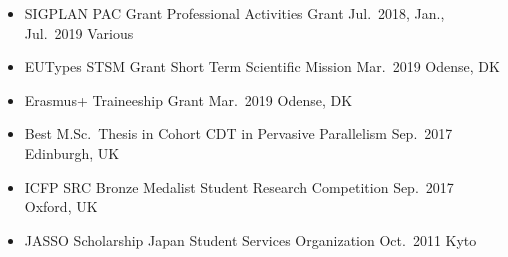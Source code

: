 \begin{itemize}
\item
  \cvevent
  {SIGPLAN PAC Grant}
  {Professional Activities Grant}
  {Jul.\ 2018, Jan., Jul.\ 2019}
  {Various}
\item
  \cvevent
  {EUTypes STSM Grant}
  {Short Term Scientific Mission}
  {Mar.\ 2019}
  {Odense, DK}
\item
  \cvevent
  {Erasmus+ Traineeship Grant}
  {}
  {Mar.\ 2019}
  {Odense, DK}
\item
  \cvevent
  {Best M.Sc.\ Thesis in Cohort}
  {CDT in Pervasive Parallelism}
  {Sep.\ 2017}
  {Edinburgh, UK}
\item
  \cvevent
  {ICFP SRC Bronze Medalist}
  {Student Research Competition}
  {Sep.\ 2017}
  {Oxford, UK}
\item
  \cvevent
  {JASSO Scholarship}
  {Japan Student Services Organization}
  {Oct.\ 2011}
  {Kyto}
\end{itemize}

